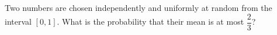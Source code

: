 Two numbers are chosen independently and uniformly at random from the interval $[0,1]$. What is the probability that their mean is at most $\dfrac{2}{3}$?
